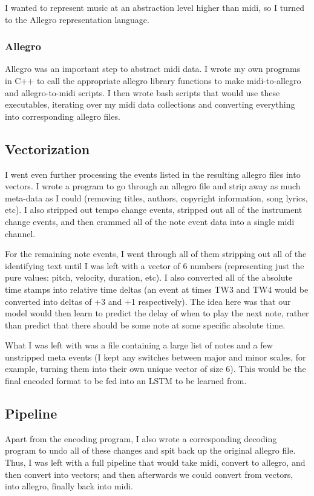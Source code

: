 \documentclass[12pt]{article}
\begin{document}
I wanted to represent music at an abstraction level higher than midi, so I turned to the Allegro representation language.

\subsubsection{Allegro}

Allegro was an important step to abstract midi data. I wrote my own programs in C++ to call the appropriate allegro library functions to make midi-to-allegro and allegro-to-midi scripts. I then wrote bash scripts that would use these executables, iterating over my midi data collections and converting everything into corresponding allegro files.

\subsection{Vectorization}

I went even further processing the events listed in the resulting allegro files into vectors. I wrote a program to go through an allegro file and strip away as much meta-data as I could (removing titles, authors, copyright information, song lyrics, etc). I also stripped out tempo change events, stripped out all of the instrument change events, and then crammed all of the note event data into a single midi channel.

For the remaining note events, I went through all of them stripping out all of the identifying text until I was left with a vector of 6 numbers (representing just the pure values: pitch, velocity, duration, etc). I also converted all of the absolute time stamps into relative time deltas (an event at times TW3 and TW4 would be converted into deltas of +3 and +1 respectively). The idea here was that our model would then learn to predict the delay of when to play the next note, rather than predict that there should be some note at some specific absolute time.

What I was left with was a file containing a large list of notes and a few unstripped meta events (I kept any switches between major and minor scales, for example, turning them into their own unique vector of size 6). This would be the final encoded format to be fed into an LSTM to be learned from.

\subsection{Pipeline}
Apart from the encoding program, I also wrote a corresponding decoding program to undo all of these changes and spit back up the original allegro file.
Thus, I was left with a full pipeline that would take midi, convert to allegro, and then convert into vectors; and then afterwards we could convert from vectors, into allegro, finally back into midi. 
\end{document}
